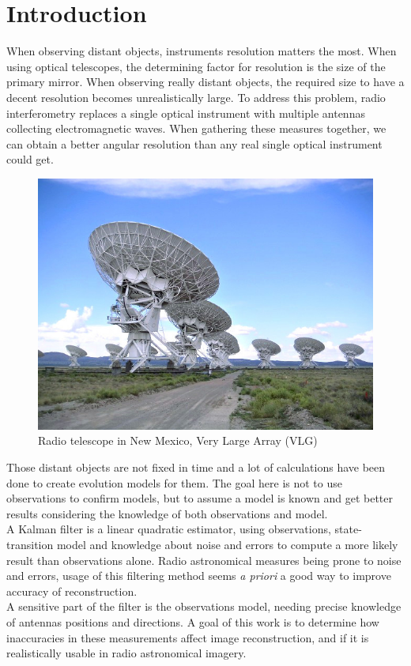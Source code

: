 \documentclass[titlepage,11pt]{article}
\begin{document}
	\newpage
	\part{Introduction}
	
	When observing distant objects, instruments resolution matters the most. When using optical telescopes, the determining factor for resolution is the size of the primary mirror. When observing really distant objects, the required size to have a decent resolution becomes unrealistically large. To address this problem, radio interferometry replaces a single optical instrument with multiple antennas collecting electromagnetic waves. When gathering these measures together, we can obtain a better angular resolution than any real single optical instrument could get. \\
	
	\begin{figure}[H]
		\centering
		\includegraphics[width=.5\linewidth]{src/radioastro}
		\caption{Radio telescope in New Mexico, Very Large Array (VLG)}
	\end{figure}
	
	Those distant objects are not fixed in time and a lot of calculations have been done to create evolution models for them. The goal here is not to use observations to confirm models, but to assume a model is known and get better results considering the knowledge of both observations and model. \\ 
	
	A Kalman filter is a linear quadratic estimator, using observations, state-transition model and knowledge about noise and errors to compute a more likely result than observations alone. Radio astronomical measures being prone to noise and errors, usage of this filtering method seems \emph{a priori} a good way to improve accuracy of reconstruction. \\
		
	A sensitive part of the filter is the observations model, needing precise knowledge of antennas positions and directions. A goal of this work is to determine how inaccuracies in these measurements affect image reconstruction, and if it is realistically usable in radio astronomical imagery. \\
	
\end{document}
